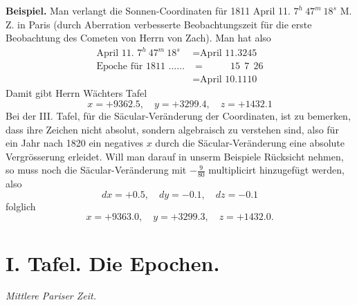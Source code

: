 \documentclass[10pt,a4paper]{article}
\begin{document}
\medskip
\noindent
\textbf{Beispiel.} Man verlangt die Sonnen-Coordinaten für 1811 April 11. $7^h\ 47^m\ 18^s$ M. Z. in Paris (durch Aberration verbesserte Beobachtungszeit für die erste Beobachtung des Cometen von Herrn von Zach). Man hat also
\begin{align*}
\text{April 11. } 7^h\ 47^m\ 18^s &= \text{April 11.3245} \\
\text{Epoche für 1811 } \ldots\ldots &= \phantom{\text{April }} 15\ \ 7\ \ 26 \\
&= \text{April 10.1110}
\end{align*}
Damit gibt Herrn Wächters Tafel
\[
x = +9362.5, \quad y = +3299.4, \quad z = +1432.1
\]
Bei der III. Tafel, für die Säcular-Veränderung der Coordinaten, ist zu bemerken, dass ihre Zeichen nicht absolut, sondern algebraisch zu verstehen sind, also für ein Jahr nach 1820 ein negatives $x$ durch die Säcular-Veränderung eine absolute Vergrösserung erleidet. Will man darauf in unserm Beispiele Rücksicht nehmen, so muss noch die Säcular-Veränderung mit $-\tfrac{9}{80}$ multiplicirt hinzugefügt werden, also
\[
dx = +0.5, \quad dy = -0.1, \quad dz = -0.1
\]
folglich
\[
x = +9363.0, \quad y = +3299.3, \quad z = +1432.0.
\]

\clearpage
\section*{I. Tafel. Die Epochen.}

\begin{center}
\small
\textit{Mittlere Pariser Zeit.}
\end{center}
\end{document}

